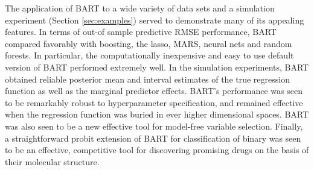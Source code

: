 \documentclass[aoas,nameyear,dvips]{arximspdf}
\begin{document}
The application of BART to a wide variety of data sets and a simulation
experiment (Section \ref{sec:examples}) served to demonstrate many of
its appealing features. In terms of out-of sample predictive RMSE
performance, BART compared favorably with boosting, the lasso, MARS,
neural nets and random forests.  In particular, the computationally
inexpensive and easy to use default version of BART performed extremely
well. In the simulation experiments, BART obtained reliable posterior
mean and interval estimates of the true regression function as well as
the marginal predictor effects.  BART's performance was seen to be
remarkably robust to hyperparameter specification, and remained
effective when the regression function was buried in ever higher
dimensional spaces. BART was also seen to be a new effective tool for
model-free variable selection.  Finally, a straightforward probit
extension of BART for classification of binary  was seen to be an
effective, competitive tool for discovering promising drugs on the
basis of their molecular structure.
\end{document}
